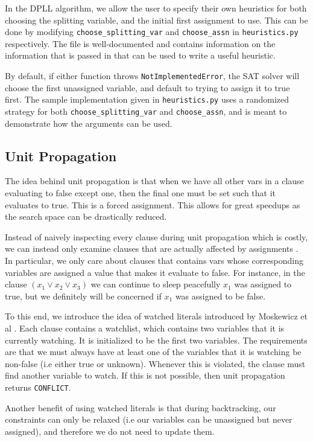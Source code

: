 \documentclass[11pt]{article}
\begin{document}
In the DPLL algorithm, we allow the user to specify their own heuristics for both choosing the splitting variable, and the initial first assignment to use. This can be done by modifying \texttt{choose\_splitting\_var} and \texttt{choose\_assn} in \texttt{heuristics.py} respectively. The file is well-documented and contains information on the information that is passed in that can be used to write a useful heuristic.

By default, if either function throws \texttt{NotImplementedError}, the SAT solver will choose the first unassigned variable, and default to trying to assign it to true first. The sample implementation given in \texttt{heuristics.py} uses a randomized strategy for both \texttt{choose\_splitting\_var} and \texttt{choose\_assn}, and is meant to demonstrate how the arguments can be used.

\subsection{Unit Propagation}

The idea behind unit propagation is that when we have all other vars in a clause evaluating to false except one, then the final one must be set such that it evaluates to true. This is a forced assignment. This allows for great speedups as the search space can be drastically reduced.

Instead of naively inspecting every clause during unit propagation which is costly, we can instead only examine clauses that are actually affected by assignments \cite{swords}. In particular, we only care about clauses that contains vars whose corresponding variables are assigned a value that makes it evaluate to false. For instance, in the clause $(x_1 \vee x_2 \vee x_3)$ we can continue to sleep peacefully $x_1$ was assigned to true, but we definitely will be concerned if $x_1$ was assigned to be false.

To this end, we introduce the idea of watched literals introduced by Moskewicz et al \cite{chaff}. Each clause contains a watchlist, which contains two variables that it is currently watching. It is initialized to be the first two variables. The requirements are that we must always have at least one of the variables that it is watching be non-false (i.e either true or unknown). Whenever this is violated, the clause must find another variable to watch. If this is not possible, then unit propagation returns \texttt{CONFLICT}. 

Another benefit of using watched literals is that during backtracking, our constraints can only be relaxed (i.e our variables can be unassigned but never assigned), and therefore we do not need to update them. 
\end{document}
